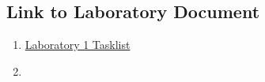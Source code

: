 \documentclass[11pt]{article}
\makeatletter
\providecommand{\tightlist}{%
      \setlength{\itemsep}{0pt}\setlength{\parskip}{0pt}}
\newcommand{\boxspacing}{\kern\kvtcb@left@rule\kern\kvtcb@boxsep}
\newcommand{\prompt}[4]{
        {\ttfamily\llap{{\color{#2}[#3]:\hspace{3pt}#4}}\vspace{-\baselineskip}}
    }
\makeatother
\begin{document}
    \hypertarget{link-to-laboratory-document}{%
\subsection{Link to Laboratory
Document}\label{link-to-laboratory-document}}

\begin{enumerate}
\def\labelenumi{\arabic{enumi}.}
\tightlist
\item
  \href{http://54.243.252.9/ce-3105-webroot/2-Exercises/laboratory1/laboratory1.html}{Laboratory
  1 Tasklist}
\item
\end{enumerate}

    

    

    \begin{tcolorbox}[breakable, size=fbox, boxrule=1pt, pad at break*=1mm,colback=cellbackground, colframe=cellborder]
\prompt{In}{incolor}{ }{\boxspacing}
\begin{Verbatim}[commandchars=\\\{\}]

\end{Verbatim}
\end{tcolorbox}


    
    
    
\end{document}

